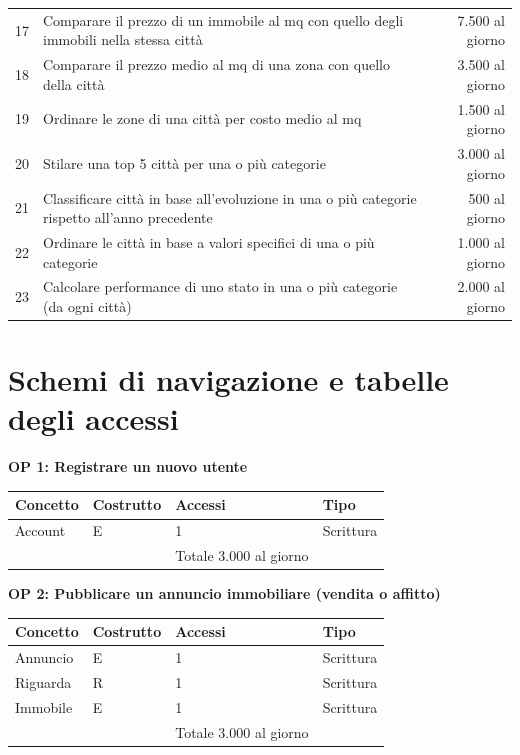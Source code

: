 \documentclass[a4paper,12pt]{report}
\begin{document}
\begin{table}[h!]
\begin{tabular}{||c l r||}
             17 & Comparare il prezzo di un immobile al mq con quello degli immobili nella stessa città & 7.500 al giorno \\
             18 & Comparare il prezzo medio al mq di una zona con quello della città & 3.500 al giorno \\ 
             19 & Ordinare le zone di una città per costo medio al mq & 1.500 al giorno \\
             20 & Stilare una top 5 città per una o più categorie & 3.000 al giorno \\
             21 & Classificare città in base all'evoluzione in una o più categorie rispetto all'anno precedente & 500 al giorno \\ 
             22 & Ordinare le città in base a valori specifici di una o più categorie & 1.000 al giorno \\ 
             23 & Calcolare performance di uno stato in una o più categorie (da ogni città) & 2.000 al giorno \\ [1ex] 
             \hline
             \end{tabular}
        \end{table}
        	
    	\section{Schemi di navigazione e tabelle degli accessi}
        	
        \textbf{OP 1: Registrare un nuovo utente}
        	\begin{table}[h!]
            \centering
             \begin{tabular}{||l l l l||}
             \hline
             Concetto & Costrutto & Accessi & Tipo \\ [0.5ex] 
             \hline\hline
             Account & E & 1 & Scrittura \\ 
             \hline
              &   & Totale  3.000 al giorno &  \\ [1ex] 
             \hline
             \end{tabular}
            \end{table}

            \textbf{OP 2: Pubblicare un annuncio immobiliare (vendita o affitto)}
        	\begin{table}[h!]
            \centering
             \begin{tabular}{||l l l l||}
             \hline
             Concetto & Costrutto & Accessi & Tipo \\ [0.5ex] 
             \hline\hline
             Annuncio & E & 1 & Scrittura \\ 
             Riguarda & R & 1 & Scrittura \\ 
             Immobile & E & 1 & Scrittura \\ 
             \hline
                &   & Totale  3.000 al giorno &  \\ [1ex] 
             \hline
             \end{tabular}
            \end{table}
\end{document}
